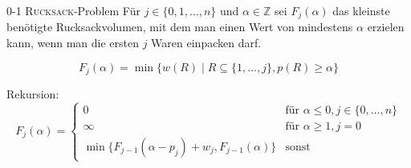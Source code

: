 \begin{frame}{0-1 \textsc{Rucksack}-Problem}
    Für $j \in \{0,1,...,n\}$ und $\alpha \in \mathbb{Z}$ sei $F_j(\alpha)$ das kleinste benötigte Rucksackvolumen, mit dem
    man einen Wert von mindestens $\alpha$ erzielen kann, wenn man die ersten $j$ Waren einpacken darf. 
    
    \begin{equation*}
        F_j(\alpha) = \min\{w(R) \mid R \subseteq \{1,...,j\}, p(R) \geq \alpha  \}
    \end{equation*}
    
    Rekursion:
    \begin{equation*}
        F_j(\alpha) = \begin{cases}
        0 & \text{für } \alpha\leq 0, j \in \{0,...,n \} \\
        \infty & \text{für } \alpha\geq 1, j = 0 \\
        \min\{F_{j-1}(\alpha-p_j) + w_j, F_{j-1}(\alpha) \} & \text{sonst}
        \end{cases}       
    \end{equation*}
\end{frame}

